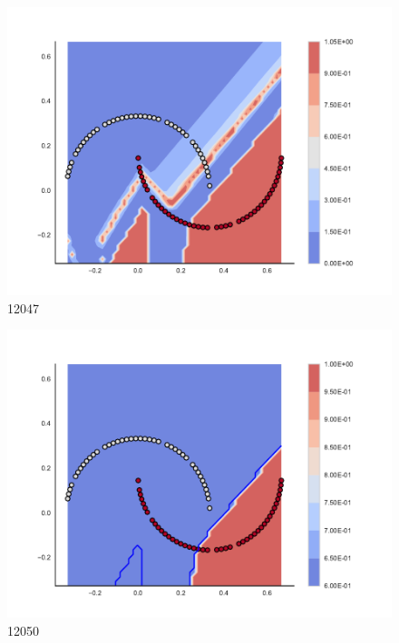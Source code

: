 \begin{subfigure}[b]{0.09\textwidth}
    \includegraphics[clip, trim=2.35cm 1.75cm 4.5cm 0cm,width=\textwidth]{img/convergence/12047.pdf}
    \caption{12047}
    \label{fig:convergence_12047}
\end{subfigure}
%
\begin{subfigure}[b]{0.09\textwidth}
    \includegraphics[clip, trim=2.35cm 1.75cm 4.5cm 0cm,width=\textwidth]{img/convergence/12050.pdf}
    \caption{12050}
    \label{fig:convergence_12050}
\end{subfigure}
%
